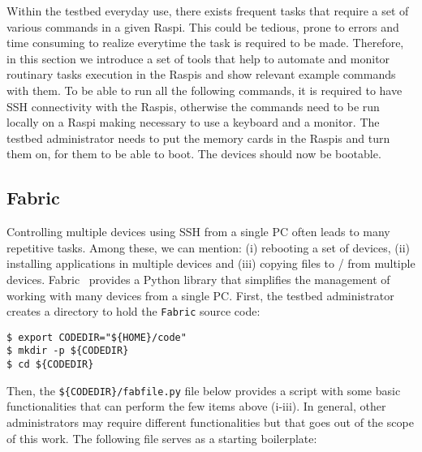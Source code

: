 
\label{sec:tools}
Within the testbed everyday use, there exists frequent tasks that require
a set of various commands in a given \ac{Raspi}. This could be tedious, prone
to errors and time consuming to realize everytime the task is required to be
made. Therefore, in this section we introduce a set of tools that help to
automate and monitor routinary tasks execution in the \ac{Raspi}s and show
relevant example commands with them. To be able to run all the following
commands, it is required to have \ac{SSH} connectivity with the \ac{Raspi}s,
otherwise the commands need to be run locally on a \ac{Raspi} making
necessary to use a keyboard and a monitor. The testbed
administrator needs to put the memory cards in the \ac{Raspi}s and turn them
on, for them to be able to boot. The devices should now be bootable.


\subsection{Fabric}
Controlling multiple devices using \ac{SSH} from a single \ac{PC}
often leads to many repetitive tasks. Among these, we can mention:
(i) rebooting a set of devices, (ii) installing applications in multiple
devices and (iii) copying files to / from multiple devices.
Fabric~\cite{python_fabric} provides a Python library that simplifies the
management of working with many devices from a single \ac{PC}. First, the
testbed administrator creates a directory to hold the \texttt{Fabric} source
code:

\begin{lstlisting}[]
$ export CODEDIR="${HOME}/code"
$ mkdir -p ${CODEDIR}
$ cd ${CODEDIR}
\end{lstlisting}
\FloatBarrier
\vspace{-5mm}

Then, the \texttt{\$\{CODEDIR\}/fabfile.py} file below provides a script with
some basic functionalities that can perform the few items above (i-iii).
In general, other administrators may require different functionalities
but that goes out of the scope of this work. The following
file serves as a starting boilerplate:

